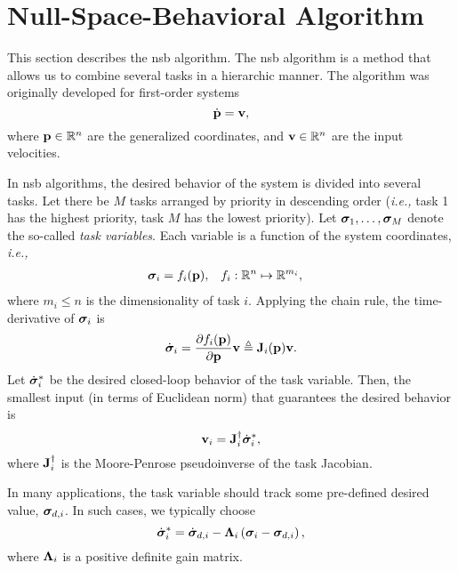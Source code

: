 \section{Null-Space-Behavioral Algorithm}
\label{sec:background_NSB}

This section describes the \acrfull{nsb} algorithm.
The \gls{nsb} algorithm is a method that allows us to combine several tasks in a hierarchic manner.
The algorithm was originally developed for first-order systems
\begin{equation}
    \dot{\mathbf{p}} = \mathbf{v},
\end{equation}
where $\mathbf{p} \in \mathbb{R}^n$ are the generalized coordinates, and $\mathbf{v} \in \mathbb{R}^n$ are the input velocities.

In \gls{nsb} algorithms, the desired behavior of the system is divided into several tasks.
Let there be $M$ tasks arranged by priority in descending order (\emph{i.e.,} task 1 has the highest priority, task $M$ has the lowest priority).
Let $\bm{\sigma}_1, \ldots, \bm{\sigma}_M$ denote the so-called \emph{task variables}.
Each variable is a function of the system coordinates, \emph{i.e.,}
\begin{align}
    \bm{\sigma}_i &= f_i(\mathbf{p}), &
    f_i &: \mathbb{R}^n \mapsto \mathbb{R}^{m_i},
\end{align}
where $m_i \leq n$ is the dimensionality of task $i$.
Applying the chain rule, the time-derivative of $\bm{\sigma}_i$ is
\begin{equation}
    \dot{\bm{\sigma}}_i = \frac{\partial f_i(\mathbf{p})}{\partial \mathbf{p}} \mathbf{v} \triangleq \mathbf{J}_i(\mathbf{p}) \mathbf{v}.
\end{equation}
Let $\dot{\bm{\sigma}}_i^{*}$ be the desired closed-loop behavior of the task variable.
Then, the smallest input (in terms of Euclidean norm) that guarantees the desired behavior is
\begin{equation}
    \mathbf{v}_i = \mathbf{J}_i^{\dagger} \dot{\bm{\sigma}}_i^{*},
    \label{eq:background_NSB_velocity_i}
\end{equation}
where $\mathbf{J}_i^{\dagger}$ is the Moore-Penrose pseudoinverse of the task Jacobian.

\begin{rmk}
    In many applications, the task variable should track some pre-defined desired value, $\bm{\sigma}_{d, i}$.
    In such cases, we typically choose
    \begin{equation}
        \dot{\bm{\sigma}}_i^{*} = \dot{\bm{\sigma}}_{d, i} - \bm{\Lambda}_i \left(\bm{\sigma}_i - \bm{\sigma}_{d,i}\right),    
    \end{equation}
    where $\bm{\Lambda}_i$ is a positive definite gain matrix.
\end{rmk}

